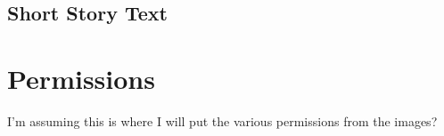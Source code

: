  

\section{Short Story Text}





\chapter{Permissions}

I'm assuming this is where I will put the various permissions from the images?


\backmatter


